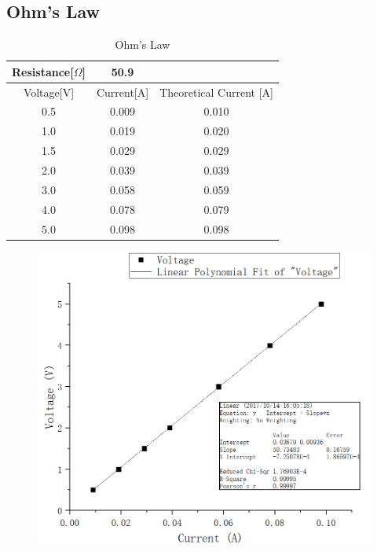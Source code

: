 \documentclass[12pt]{article}
\begin{document}
\subsection{Ohm's Law}
\begin{table}[H]
\centering
\begin{tabular}{|c|c|c|}
\hline
Resistance[$\Omega$] & 50.9       \\ \hline
Voltage[V]   & Current[A]&Theoretical Current [A] \\ \hline
0.5          & 0.009      &0.010\\ \hline
1.0          & 0.019      &0.020\\ \hline
1.5          & 0.029      &0.029\\ \hline
2.0          & 0.039      &0.039\\ \hline
3.0          & 0.058      &0.059\\ \hline
4.0          & 0.078      &0.079\\ \hline
5.0          & 0.098      &0.098\\ \hline
\end{tabular}
\caption{Ohm's Law}
\end{table}
\begin{figure}[H]
\centering
\includegraphics[scale=0.3]{P6.jpg}
\end{figure}
\end{document}
